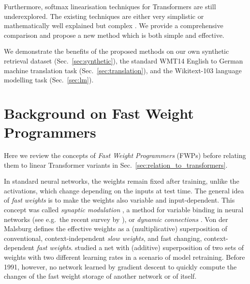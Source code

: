 \documentclass{article}
\theoremstyle{definition}
\begin{document}
Furthermore, softmax linearisation techniques for Transformers
are still underexplored.
The existing techniques are either very simplistic \citep{katharopoulos2020transformers}
or mathematically well explained but complex \mbox{\citep{choromanski2020rethinking, peng2021random}}.
We provide a comprehensive comparison and propose
a new method which is both simple and effective.

We demonstrate the benefits of the proposed methods on our own synthetic retrieval dataset (Sec.~\ref{sec:synthetic}), the standard WMT14 English to German machine translation task (Sec.~\ref{sec:translation}), and the Wikitext-103 \citep{merity2016pointer} language modelling task (Sec.~\ref{sec:lm})\footnotemark[2].

\section{Background on Fast Weight Programmers}
\label{sec:fastweights}
Here we review the concepts of \textit{Fast Weight Programmers} (FWPs)
before relating them to linear Transformer variants in Sec.~\ref{sec:relation_to_transformers}.

In standard neural networks, the weights remain fixed after training,
unlike the activations, which change depending on the inputs at test time.
The general idea of \textit{fast weights} is to make the weights also 
variable and input-dependent.
This concept was called \textit{synaptic modulation} 
\citep{von1981correlation},
a method for variable binding in neural networks
(see e.g.~the recent survey by \citet{greff2020binding}),
or \textit{dynamic connections} \citep{feldman1982dynamic}.
Von der Malsburg defines the effective weights as a (multiplicative) superposition of conventional,
context-independent \textit{slow weights}, and fast changing,
context-dependent \textit{fast weights}.
 \citet{hinton1987using} studied
a net with  (additive) superposition of two sets of weights
with two different learning rates
in a scenario of model retraining. Before 1991, however, no network learned by gradient descent to quickly compute the changes of the fast weight storage of another network or of itself.
\end{document}
